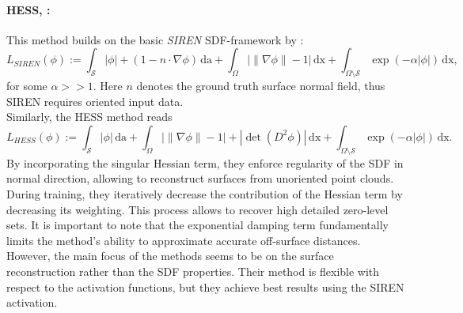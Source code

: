 \documentclass[12pt,openany]{book}
\def\S{\mathcal{S}}
\theoremstyle{plainnormal}
\theoremstyle{remark}
\begin{document}
\paragraph{HESS, \cite{wang2023neuralsingularhessianimplicitneuralrepresentation}:} This method builds on the basic \emph{SIREN} SDF-framework by \cite{sitzmann2020implicitneuralrepresentationsperiodic}:
$$
L_{SIREN}(\phi) := \int_\S |\phi| + (1-n\cdot\nabla \phi) \,\mathrm{da} + \int_\Omega \big|\|\nabla \phi\| - 1\big| \,\mathrm{dx} + \int_{\Omega\setminus\S} \exp(-\alpha |\phi|) \,\mathrm{dx},
$$
for some $\alpha >> 1$. Here $n$ denotes the ground truth surface normal field, thus SIREN requires oriented input data.\\
Similarly, the HESS method reads
$$L_{HESS}(\phi) := \int_\S |\phi| \,\mathrm{da} + \int_\Omega \big|\|\nabla \phi\| - 1\big|  + |\det(D^2\phi)| \,\mathrm{dx} + \int_{\Omega\setminus\S} \exp(-\alpha |\phi|) \,\mathrm{dx}. $$
By incorporating the singular Hessian term, they enforce regularity of the SDF in normal direction, allowing to reconstruct surfaces from unoriented point clouds. \\
During training, they iteratively decrease the contribution of the Hessian term by decreasing its weighting. This process allows to recover high detailed zero-level sets. It is important to note that the exponential damping term fundamentally limits the method’s ability to approximate accurate off-surface distances. However, the main focus of the methods seems to be on the surface reconstruction rather than the SDF properties. Their method is flexible with respect to the activation functions, but they achieve best results using the SIREN activation. 
\end{document}
